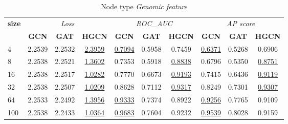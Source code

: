\begin{table}
    \begin{subtable}[t]{\textwidth}
        \centering
        \begin{tabular}{l|ccc|ccc|ccc}      
            \toprule
            \multirow{2}{*}{\textbf{size}} & \multicolumn{3}{c}{\textit{Loss}} & \multicolumn{3}{c}{\textit{ROC\_AUC}} & \multicolumn{3}{c}{\textit{AP score}} \\
            & \textbf{GCN} & \textbf{GAT} & \textbf{HGCN} & \textbf{GCN} & \textbf{GAT} & \textbf{HGCN} & \textbf{GCN} & \textbf{GAT} & \textbf{HGCN} \\
            4 & 2.2539 & 2.2532 & \underline{2.3959} & \underline{0.7094} & 0.5958 & 0.7459 & \underline{0.6371} & 0.5268 & 0.6906 \\
            8 & 2.2538 & 2.2521 & \underline{1.3602} & 0.7353 & 0.5918 & \underline{0.8838} & 0.6796 & 0.5350 & \underline{0.8751} \\
            16 & 2.2538 & 2.2517 & \underline{1.0282} & 0.7770 & 0.6673 & \underline{0.9193} & 0.7415 & 0.6436 & \underline{0.9119} \\
            32 & 2.2538 & 2.2507 & \underline{1.0209} & 0.8628 & 0.7112 & \underline{0.9317} & 0.8249 & 0.7301 & \underline{0.9307} \\
            64 & 2.2533 & 2.2492 & \underline{1.3956} & \underline{0.9333} & 0.7374 & 0.8922 & \underline{0.9256} & 0.7765 & 0.9109 \\
            100 & 2.2538 & 2.2433 & \underline{1.0364} & \underline{0.9683} & 0.7604 & 0.9232 & \underline{0.9539} & 0.8028 & 0.9159 \\
            \bottomrule
        \end{tabular}
        \caption{Node type \textit{Genomic feature}}
        \end{subtable}
    
    \vspace{1em}
    

\end{table}

